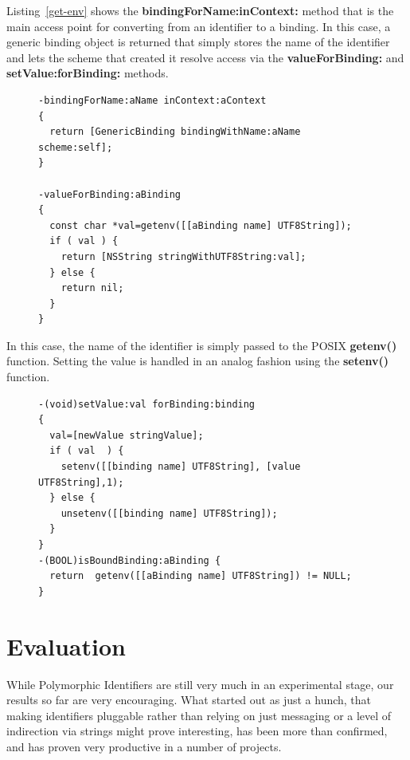 \documentclass[preprint]{sigplanconf}
\begin{document}
Listing~\ref{get-env} 
shows the {\bf bindingForName:inContext:} method that is the main access point for
converting from an identifier to a binding.  In this case, a generic binding object is returned
that simply stores the name of the identifier and lets the scheme that created it resolve
access via the {\bf valueForBinding:} and {\bf setValue:forBinding:} methods.


\begin{figure}[htbp]
\begin{lstlisting}[style=numbers,label=get-env,caption=Basic lookup in env: scheme.]
-bindingForName:aName inContext:aContext
{
  return [GenericBinding bindingWithName:aName scheme:self];
}

-valueForBinding:aBinding
{
  const char *val=getenv([[aBinding name] UTF8String]);
  if ( val ) {
    return [NSString stringWithUTF8String:val];
  } else {
    return nil;
  }
}
\end{lstlisting}
\end{figure}

In this case, the name of the identifier is simply passed to the POSIX {\bf getenv()} function.
Setting the value is handled in an analog fashion using the {\bf setenv()} function.


\begin{figure}[htbp]
\begin{lstlisting}[style=numbers,label=setvalue-env,caption=Set and check value in env: scheme.]
-(void)setValue:val forBinding:binding
{
  val=[newValue stringValue];
  if ( val  ) {
    setenv([[binding name] UTF8String], [value UTF8String],1);
  } else {
    unsetenv([[binding name] UTF8String]);
  }
}
-(BOOL)isBoundBinding:aBinding {
  return  getenv([[aBinding name] UTF8String]) != NULL;
}
\end{lstlisting}
\end{figure}



\section{Evaluation}
\label{evaluation}

While Polymorphic Identifiers are still very much in an experimental stage, our
results so far are very encouraging.  What started out as just a hunch, that making
identifiers pluggable rather than relying on just messaging or a level of indirection
via strings might prove interesting, has been more than confirmed, and has proven
very productive in a number of projects.
\end{document}
